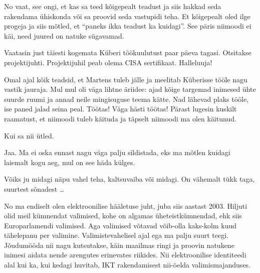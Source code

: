 
No vaat,  see ongi, et kas sa teed kõigepealt teadust ja siis hakkad seda rakendama ühiskonda või sa proovid seda vastupidi teha. Et kõigepealt oled ilge progeja ja siis mõtled, et \enquote{paneks ikka teadust ka kuidagi}. See päris niimoodi ei käi, need juured on natuke sügavamad.

Vaatasin just täiesti kogemata Küberi töökuulutust paar päeva tagasi. Otsitakse projektijuhti. Projektijuhil  peab olema CISA sertifikaat. Halleluuja!

Omal ajal  kõik teadsid, et Martens tuleb jälle ja meelitab Küberisse tööle nagu vastik jauraja. Mul mul oli väga lihtne äriidee:  ajad kõige targemad inimesed ühte suurde ruumi ja annad neile mingisuguse teema kätte. Nad lähevad plaks tööle, ise paned jalad seina peal. Töötas! Väga hästi töötas! Pärast lugesin kuskilt raamatust, et niimoodi tuleb käituda ja täpselt niimoodi ma olen käitunud.




Kui sa nii ütled.


Jaa. Ma ei oska ennast nagu väga palju sildistada, eks ma   mõtlen kuidagi laiemalt kogu aeg, mul on see häda külges.


Võiks ju midagi näpu vahel teha, kaltsuvaiba või midagi. On vähemalt tükk taga, suurtest sõnadest \ldots


No ma endiselt olen elektroonilise hääletuse juht, juba siis aastast 2003. Hiljuti olid meil  kümnendat valimised, kohe on algamas üheteistkümnendad, ehk siis Europarlamendi valimised. Aga valimised võtavad võib-olla kaks-kolm kuud tähelepanu per valimine. Valimistevahelisel ajal ega ma palju suurt teegi. Jõudumööda nii nagu kutsutakse, käin maailmas ringi ja proovin  natukene  inimesi aidata nende arengutes erinevates riikides. Nii elektroonilise identiteedi alal kui ka, kui kedagi huvitab,  IKT rakendamisest nii-öelda valimismajanduses.

